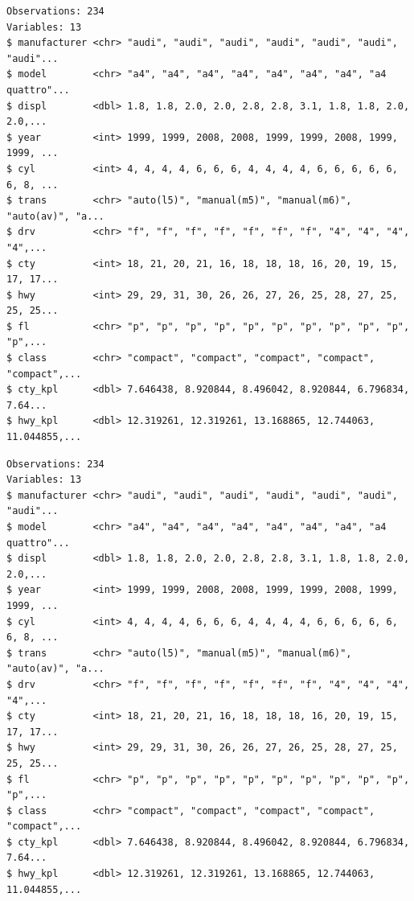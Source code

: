 \documentclass[
  11pt,
]{krantz}
\newenvironment{Shaded}{\begin{snugshade}}{\end{snugshade}}
\newcommand{\CommentTok}[1]{\textcolor[rgb]{0.37,0.37,0.37}{\textit{#1}}}
\newcommand{\DataTypeTok}[1]{\textcolor[rgb]{0.27,0.27,0.27}{#1}}
\newcommand{\KeywordTok}[1]{\textcolor[rgb]{0.27,0.27,0.27}{\textbf{#1}}}
\newcommand{\NormalTok}[1]{#1}
\newcommand{\OperatorTok}[1]{\textcolor[rgb]{0.43,0.43,0.43}{\textbf{#1}}}
\newcommand{\StringTok}[1]{\textcolor[rgb]{0.5,0.5,0.5}{#1}}
\begin{document}
\begin{verbatim}
Observations: 234
Variables: 13
$ manufacturer <chr> "audi", "audi", "audi", "audi", "audi", "audi", "audi"...
$ model        <chr> "a4", "a4", "a4", "a4", "a4", "a4", "a4", "a4 quattro"...
$ displ        <dbl> 1.8, 1.8, 2.0, 2.0, 2.8, 2.8, 3.1, 1.8, 1.8, 2.0, 2.0,...
$ year         <int> 1999, 1999, 2008, 2008, 1999, 1999, 2008, 1999, 1999, ...
$ cyl          <int> 4, 4, 4, 4, 6, 6, 6, 4, 4, 4, 4, 6, 6, 6, 6, 6, 6, 8, ...
$ trans        <chr> "auto(l5)", "manual(m5)", "manual(m6)", "auto(av)", "a...
$ drv          <chr> "f", "f", "f", "f", "f", "f", "f", "4", "4", "4", "4",...
$ cty          <int> 18, 21, 20, 21, 16, 18, 18, 18, 16, 20, 19, 15, 17, 17...
$ hwy          <int> 29, 29, 31, 30, 26, 26, 27, 26, 25, 28, 27, 25, 25, 25...
$ fl           <chr> "p", "p", "p", "p", "p", "p", "p", "p", "p", "p", "p",...
$ class        <chr> "compact", "compact", "compact", "compact", "compact",...
$ cty_kpl      <dbl> 7.646438, 8.920844, 8.496042, 8.920844, 6.796834, 7.64...
$ hwy_kpl      <dbl> 12.319261, 12.319261, 13.168865, 12.744063, 11.044855,...
\end{verbatim}

\begin{Shaded}
\end{Shaded}

\begin{verbatim}
Observations: 234
Variables: 13
$ manufacturer <chr> "audi", "audi", "audi", "audi", "audi", "audi", "audi"...
$ model        <chr> "a4", "a4", "a4", "a4", "a4", "a4", "a4", "a4 quattro"...
$ displ        <dbl> 1.8, 1.8, 2.0, 2.0, 2.8, 2.8, 3.1, 1.8, 1.8, 2.0, 2.0,...
$ year         <int> 1999, 1999, 2008, 2008, 1999, 1999, 2008, 1999, 1999, ...
$ cyl          <int> 4, 4, 4, 4, 6, 6, 6, 4, 4, 4, 4, 6, 6, 6, 6, 6, 6, 8, ...
$ trans        <chr> "auto(l5)", "manual(m5)", "manual(m6)", "auto(av)", "a...
$ drv          <chr> "f", "f", "f", "f", "f", "f", "f", "4", "4", "4", "4",...
$ cty          <int> 18, 21, 20, 21, 16, 18, 18, 18, 16, 20, 19, 15, 17, 17...
$ hwy          <int> 29, 29, 31, 30, 26, 26, 27, 26, 25, 28, 27, 25, 25, 25...
$ fl           <chr> "p", "p", "p", "p", "p", "p", "p", "p", "p", "p", "p",...
$ class        <chr> "compact", "compact", "compact", "compact", "compact",...
$ cty_kpl      <dbl> 7.646438, 8.920844, 8.496042, 8.920844, 6.796834, 7.64...
$ hwy_kpl      <dbl> 12.319261, 12.319261, 13.168865, 12.744063, 11.044855,...
\end{verbatim}
\end{document}
